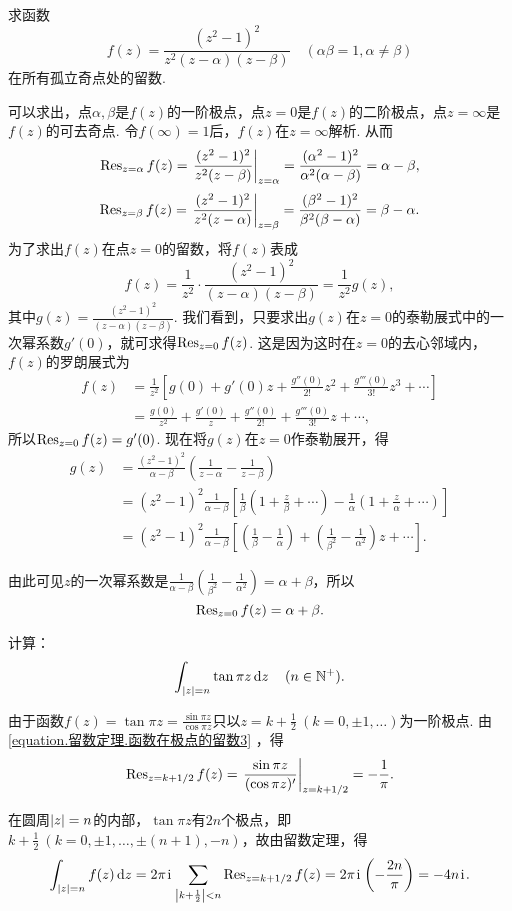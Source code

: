 \begin{example}
求函数\[
f(z) = \frac{(z^2-1)^2}{z^2(z-\alpha)(z-\beta)}
\quad(\alpha\beta=1, \alpha\neq\beta)
\]在所有孤立奇点处的留数.
\begin{solution}
可以求出，点\(\alpha,\beta\)是\(f(z)\)的一阶极点，点\(z=0\)是\(f(z)\)的二阶极点，点\(z=\infty\)是\(f(z)\)的可去奇点.
令\(f(\infty)=1\)后，\(f(z)\)在\(z=\infty\)解析.
从而\[
\Res_{z=\alpha} f(z)
= \eval{ \frac{(z^2-1)^2}{z^2(z-\beta)} }_{z=\alpha}
= \frac{(\alpha^2-1)^2}{\alpha^2(\alpha-\beta)}
= \alpha-\beta,
\]\[
\Res_{z=\beta} f(z)
= \eval{ \frac{(z^2-1)^2}{z^2(z-\alpha)} }_{z=\beta}
= \frac{(\beta^2-1)^2}{\beta^2(\beta-\alpha)}
= \beta-\alpha.
\]为了求出\(f(z)\)在点\(z=0\)的留数，将\(f(z)\)表成\[
f(z) = \frac{1}{z^2} \cdot \frac{(z^2-1)^2}{(z-\alpha)(z-\beta)}
= \frac{1}{z^2} g(z),
\]其中\(g(z) = \frac{(z^2-1)^2}{(z-\alpha)(z-\beta)}\).
我们看到，只要求出\(g(z)\)在\(z=0\)的泰勒展式中的一次幂系数\(g'(0)\)，就可求得\(\operatorname{Res}_{z=0} f(z)\).
这是因为这时在\(z=0\)的去心邻域内，\(f(z)\)的罗朗展式为\begin{align*}
f(z) &= \frac{1}{z^2} \left[ g(0) + g'(0) z + \frac{g''(0)}{2!} z^2 + \frac{g'''(0)}{3!} z^3 + \dotsb \right] \\
&= \frac{g(0)}{z^2} + \frac{g'(0)}{z} + \frac{g''(0)}{2!} + \frac{g'''(0)}{3!} z + \dotsb,
\end{align*}
所以\(\operatorname{Res}_{z=0} f(z) = g'(0)\).
现在将\(g(z)\)在\(z=0\)作泰勒展开，得\begin{align*}
g(z) &= \frac{(z^2-1)^2}{\alpha-\beta} \left(\frac{1}{z-\alpha}-\frac{1}{z-\beta}\right) \\
&= (z^2-1)^2 \frac{1}{\alpha-\beta} \left[
\frac{1}{\beta} \left(1+\frac{z}{\beta}+\dotsb\right)
- \frac{1}{\alpha} \left(1+\frac{z}{\alpha}+\dotsb\right)
\right] \\
&= (z^2-1)^2 \frac{1}{\alpha-\beta} \left[
\left(\frac{1}{\beta}-\frac{1}{\alpha}\right)
+ \left(\frac{1}{\beta^2}-\frac{1}{\alpha^2}\right) z
+ \dotsb
\right].
\end{align*}

由此可见\(z\)的一次幂系数是\(\frac{1}{\alpha-\beta} \left(\frac{1}{\beta^2}-\frac{1}{\alpha^2}\right) = \alpha+\beta\)，所以\[
\operatorname{Res}_{z=0} f(z) = \alpha+\beta.
\]
\end{solution}
\end{example}

\begin{example}
计算：\[
\int_{\abs{z}=n} \tan \pi z \dd{z}
\quad(n\in\mathbb{N}^+).
\]
\begin{solution}
由于函数\(f(z) = \tan \pi z = \frac{\sin \pi z}{\cos \pi z}\)只以\(z=k+\frac{1}{2}\ (k=0,\pm1,\dotsc)\)为一阶极点.
由\cref{equation.留数定理.函数在极点的留数3} ，得\[
\Res_{z=k+1/2} f(z)
= \eval{\frac{\sin \pi z}{(\cos \pi z)'}}_{z=k+1/2}
= -\frac{1}{\pi}.
\]

在圆周\(\abs{z}=n\)的内部，\(\tan \pi z\)有\(2n\)个极点，即\(k + \frac{1}{2}\ (k=0,\pm1,\dotsc,\pm(n+1),-n)\)，故由留数定理，得\[
\int_{\abs{z}=n} f(z) \dd{z}
= 2\pi\kern1pt\mathrm{i}\kern1pt \sum\limits_{\abs{k+\frac{1}{2}}<n} \operatorname{Res}_{z=k+1/2} f(z)
= 2\pi\kern1pt\mathrm{i}\kern1pt \left(-\frac{2n}{\pi}\right)
= -4n\kern1pt\mathrm{i}\kern1pt.
\]
\end{solution}
\end{example}

